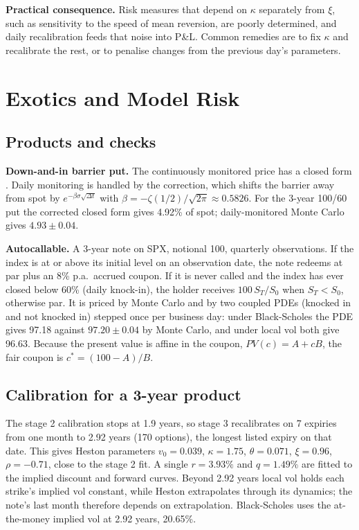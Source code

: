 \documentclass[10pt,letterpaper]{article}
\begin{document}
\begin{caution}
\textbf{Practical consequence.} Risk measures that depend on $\kappa$ separately from $\xi$, such as sensitivity to the
speed of mean reversion, are poorly determined, and daily recalibration feeds that noise into P\&L. Common remedies
are to fix $\kappa$ and recalibrate the rest, or to penalise changes from the previous day's parameters.
\end{caution}

\section{Exotics and Model Risk}\label{sec:modelrisk}
\subsection{Products and checks}
\textbf{Down-and-in barrier put.} The continuously monitored price has a closed form \citep{reiner1991}. Daily
monitoring is handled by the \citet{broadie1997} correction, which shifts the barrier away from spot by
$e^{-\beta\sigma\sqrt{\Delta t}}$ with $\beta = -\zeta(1/2)/\sqrt{2\pi}\approx 0.5826$. For the 3-year 100/60 put the corrected
closed form gives 4.92\% of spot; daily-monitored Monte Carlo gives $4.93 \pm 0.04$.

\textbf{Autocallable.} A 3-year note on SPX, notional 100, quarterly observations. If the index is at or above its initial
level on an observation date, the note redeems at par plus an 8\% p.a.\ accrued coupon. If it is never called and the
index has ever closed below 60\% (daily knock-in), the holder receives $100\,S_T/S_0$ when $S_T<S_0$, otherwise par. It is
priced by Monte Carlo and by two coupled PDEs (knocked in and not knocked in) stepped once per business day: under
Black-Scholes the PDE gives 97.18 against $97.20 \pm 0.04$ by Monte Carlo, and under local vol both give 96.63. Because the
present value is affine in the coupon, $PV(c) = A + cB$, the fair coupon is $c^\ast = (100 - A)/B$.

\subsection{Calibration for a 3-year product}
The stage 2 calibration stops at 1.9 years, so stage 3 recalibrates on 7 expiries from one month to 2.92 years (170
options), the longest listed expiry on that date. This gives Heston parameters $v_0=0.039$, $\kappa=1.75$, $\theta=0.071$,
$\xi=0.96$, $\rho=-0.71$, close to the stage 2 fit. A single $r=3.93\%$ and $q=1.49\%$ are fitted to the implied discount and
forward curves. Beyond 2.92 years local vol holds each strike's implied vol constant, while Heston extrapolates through its
dynamics; the note's last month therefore depends on extrapolation. Black-Scholes uses the at-the-money implied vol at 2.92
years, 20.65\%.
\end{document}
